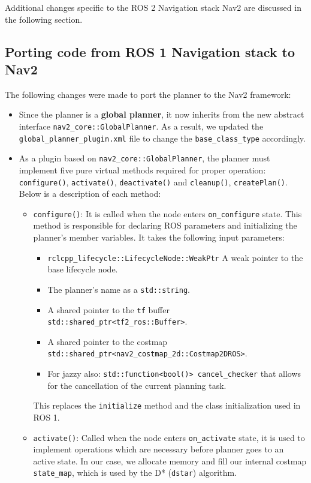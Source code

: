 Additional changes specific to the ROS 2 Navigation stack Nav2 are discussed in the following section.

\subsection{Porting code from ROS 1 Navigation stack to Nav2}
The following changes were made to port the planner to the Nav2 framework:
\begin{itemize}
	\item Since the planner is a \textbf{global planner}, it now inherits from the new abstract interface \texttt{nav2\_core::GlobalPlanner}. As a result, we updated the\\ \texttt{global\_planner\_plugin.xml} file to change the \texttt{base\_class\_type} accordingly.
	\item As a plugin based on \texttt{nav2\_core::GlobalPlanner}, the planner must implement five pure virtual methods required for proper operation: \texttt{configure()}, \texttt{activate()}, \texttt{deactivate()} and \texttt{cleanup()}, \texttt{createPlan()}. Below is a description of each method:
	\begin{itemize}
		\item \texttt{configure()}: It is called when the node enters \texttt{on\_configure} state. This method is responsible for declaring ROS parameters and initializing the planner's member variables. It takes the following input parameters:
		\begin{itemize}
			\item \texttt{rclcpp\_lifecycle::LifecycleNode::WeakPtr}  A weak pointer to the base lifecycle node.
			\item The planner’s name as a \texttt{std::string}.
			\item A shared pointer to the \texttt{tf} buffer\\ \texttt{std::shared\_ptr<tf2\_ros::Buffer>}.
			\item A shared pointer to the costmap\\ \texttt{std::shared\_ptr<nav2\_costmap\_2d::Costmap2DROS>}.
			\item For jazzy also: \texttt{std::function<bool()> cancel\_checker} that allows for the cancellation of the current planning task.
		\end{itemize}
		This replaces the \texttt{initialize} method and the class initialization used in ROS 1.
		\item \texttt{activate()}: Called when the node enters \texttt{on\_activate} state, it is used to implement operations which are necessary before planner goes to an active state. In our case, we allocate memory and fill our internal costmap \texttt{state\_map}, which is used by the D* (\texttt{dstar}) algorithm.

\end{itemize}
\end{itemize}
